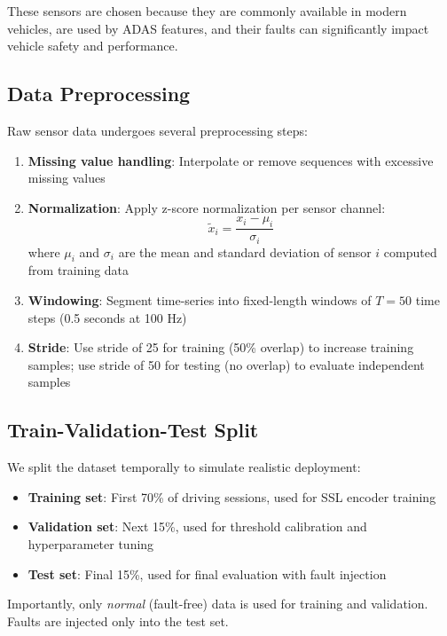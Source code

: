 These sensors are chosen because they are commonly available in modern vehicles, are used by ADAS features, and their faults can significantly impact vehicle safety and performance.

\subsection{Data Preprocessing}

Raw sensor data undergoes several preprocessing steps:

\begin{enumerate}
    \item \textbf{Missing value handling}: Interpolate or remove sequences with excessive missing values
    \item \textbf{Normalization}: Apply z-score normalization per sensor channel:
    \begin{equation}
    \tilde{x}_i = \frac{x_i - \mu_i}{\sigma_i}
    \end{equation}
    where $\mu_i$ and $\sigma_i$ are the mean and standard deviation of sensor $i$ computed from training data
    \item \textbf{Windowing}: Segment time-series into fixed-length windows of $T=50$ time steps (0.5 seconds at 100 Hz)
    \item \textbf{Stride}: Use stride of 25 for training (50\% overlap) to increase training samples; use stride of 50 for testing (no overlap) to evaluate independent samples
\end{enumerate}

\subsection{Train-Validation-Test Split}

We split the dataset temporally to simulate realistic deployment:

\begin{itemize}
    \item \textbf{Training set}: First 70\% of driving sessions, used for SSL encoder training
    \item \textbf{Validation set}: Next 15\%, used for threshold calibration and hyperparameter tuning
    \item \textbf{Test set}: Final 15\%, used for final evaluation with fault injection
\end{itemize}

Importantly, only \textit{normal} (fault-free) data is used for training and validation. Faults are injected only into the test set.

